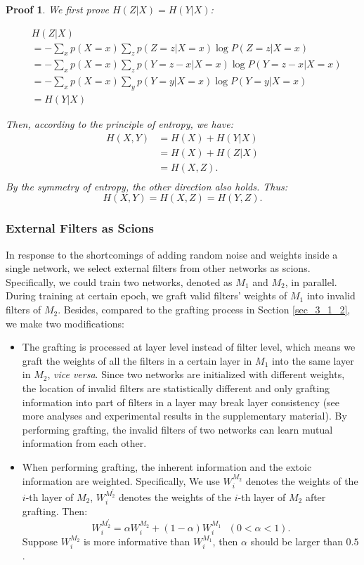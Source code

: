 \documentclass{article}
\newtheorem{Proof}{Proof}
\begin{document}
\begin{Proof}
	We first prove $H(Z|X) = H(Y|X)$:
	\begin{small}
		\begin{align*}
			&H(Z|X) \\
			&= -\sum_{x}p(X=x)\sum_{z}p(Z=z|X=x)\log P(Z=z|X=x)\\
			&= -\sum_{x}p(X=x)\sum_{z}p(Y=z-x|X=x) \log P(Y=z-x|X=x)\\
			&= -\sum_{x}p(X=x)\sum_{y}p(Y=y|X=x)\log P(Y=y|X=x)\\
			& = H(Y|X)
		\end{align*}
	\end{small}
	Then, according to the principle of entropy, we have:
	\begin{align*}
		H(X,Y)& = H(X) + H(Y|X) \\
		&= H(X) + H(Z|X)\\
		&= H(X,Z).\\
	\end{align*}
	By the symmetry of  entropy, the other direction also holds. Thus:
	\[
	H(X,Y) = H(X,Z) = H(Y,Z).
	\]
\end{Proof}

\subsubsection{External Filters as Scions}	\label{sec_3_1_3}


In response to the shortcomings of adding random noise and weights inside a single network, we select external filters from other networks as scions.
Specifically, we could train two networks, denoted as $M_{1}$ and $M_{2}$, in parallel. During training at certain epoch, we graft valid filters' weights of $M_{1}$ into invalid filters of $M_{2}$. Besides, compared to the grafting process in Section \ref{sec_3_1_2}, we make two modifications:
\begin{itemize}
	\item The grafting is processed at layer level instead of filter level, which means we graft the weights of all the filters in a certain layer in $M_{1}$ into the same layer in $M_{2}$, \emph{vice versa}. Since two networks are initialized with different weights, the location of invalid filters are statistically different and only grafting information into part of filters in a layer may break layer consistency (see more analyses and experimental results in the supplementary material).  By performing grafting, the invalid filters of two networks can learn mutual information from each other.
	\item When performing grafting, the inherent information and the extoic information are weighted. Specifically, We use $W_{i}^{M_{2}}$ denotes the weights of the $i$-th layer of $M_{2}$, $W_{i}^{M_{2}^{'}}$ denotes the weights of the $i$-th layer of $M_{2}$ after grafting. Then:
	\begin{equation}\label{weighting}
		W_{i}^{M_{2}^{'}} = \alpha W_{i}^{M_{2}} + (1-\alpha) W_{i}^{M_{1}}~~~ (0<\alpha<1).
	\end{equation}
	Suppose $W_{i}^{M_{2}}$ is more informative than $W_{i}^{M_{1}}$, then $\alpha$ should be larger than $0.5$. 
\end{itemize}
\end{document}
